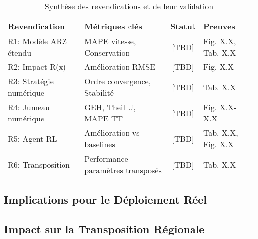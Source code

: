 {\begin{table}[htbp]
    \centering
    \caption{Synthèse des revendications et de leur validation}
    \label{tab:synthese_revendications}
    \begin{tabular}{|l|l|c|l|}
        \hline
        \textbf{Revendication}  & \textbf{Métriques clés}           & \textbf{Statut} & \textbf{Preuves}   \\
        \hline
        R1: Modèle ARZ étendu   & MAPE vitesse, Conservation        & [TBD]           & Fig. X.X, Tab. X.X \\
        R2: Impact R(x)         & Amélioration RMSE                 & [TBD]           & Fig. X.X           \\
        R3: Stratégie numérique & Ordre convergence, Stabilité      & [TBD]           & Tab. X.X           \\
        R4: Jumeau numérique    & GEH, Theil U, MAPE TT             & [TBD]           & Fig. X.X-X.X       \\
        R5: Agent RL            & Amélioration vs baselines         & [TBD]           & Tab. X.X, Fig. X.X \\
        R6: Transposition       & Performance paramètres transposés & [TBD]           & Tab. X.X           \\
        \hline
    \end{tabular}
\end{table}


\subsection{Implications pour le Déploiement Réel}
\label{subsec:implications_deploiement}

\subsection{Impact sur la Transposition Régionale}
\label{subsec:impact_transposition_regionale}

}
